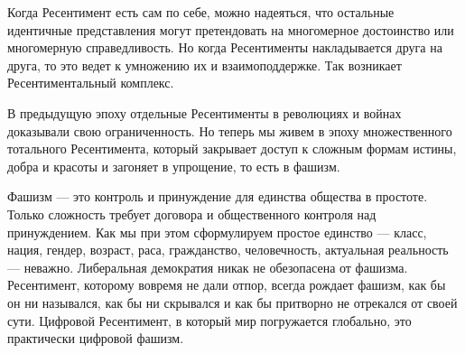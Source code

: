 Когда Ресентимент есть сам по себе, можно надеяться, что остальные идентичные
представления могут претендовать на многомерное достоинство или многомерную
справедливость. Но когда Ресентименты накладывается друга на друга, то это
ведет к умножению их и взаимоподдержке. Так возникает Ресентиментальный
комплекс.

В предыдущую эпоху отдельные Ресентименты в революциях и войнах доказывали свою
ограниченность. Но теперь мы живем в эпоху множественного тотального
Ресентимента, который закрывает доступ к сложным формам истины, добра и красоты
и загоняет в упрощение, то есть в фашизм.

Фашизм — это контроль и принуждение для единства общества в простоте. Только
сложность требует договора и общественного контроля над принуждением. Как мы
при этом сформулируем простое единство — класс, нация, гендер, возраст, раса,
гражданство, человечность, актуальная реальность — неважно. Либеральная
демократия никак не обезопасена от фашизма. Ресентимент, которому вовремя не
дали отпор, всегда рождает фашизм, как бы он ни назывался, как бы ни скрывался
и как бы притворно не отрекался от своей сути. Цифровой Ресентимент, в который
мир погружается глобально, это практически цифровой фашизм.
